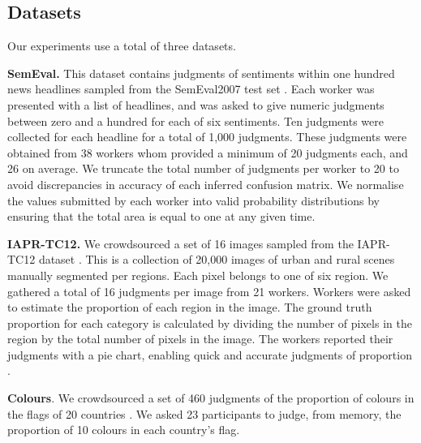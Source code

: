 \documentclass{article}
\begin{document}
\subsection{Datasets}

\label{sub:4.1-Dataset}





Our experiments use a total of three datasets. 

\textbf{SemEval.} This dataset contains judgments of sentiments
within one hundred news headlines sampled from the SemEval2007 test
set \cite{strapparava_semeval-2007_2007,snow_cheap_2008}. Each
worker was presented with a list of headlines, and was asked to give
numeric judgments between zero and a hundred for each of six sentiments.
Ten judgments were collected for each headline for a total of 1,000
judgments. These judgments were obtained from 38 workers whom provided
a minimum of 20 judgments each, and 26 on average. We truncate
the total number of judgments per worker to 20 to avoid discrepancies
in accuracy of each inferred confusion matrix. We normalise the
values submitted by each worker into valid probability distributions
by ensuring that the total area is equal to one at any given time.\textbf{} 

\textbf{IAPR-TC12.} We crowdsourced a set of 16 images sampled
from the IAPR-TC12 dataset \cite{escalante_segmented_2010,augustin_mbcc_2017}.
This is a collection of 20,000 images of urban and rural scenes
manually segmented per regions. Each pixel belongs to one of six
region. We gathered a total of 16 judgments per image from 21
workers. Workers were asked to estimate the proportion of each
region in the image. The ground truth proportion for each category
is calculated by dividing the number of pixels in the region by the
total number of pixels in the image. The workers reported their judgments
with a pie chart, enabling quick and accurate judgments of proportion
\cite{hollands_judgments_1992}. 

\textbf{Colours}. We crowdsourced a set of 460 judgments of the
proportion of colours in the flags of 20 countries \cite{augustin_mbcc_2017}.
We asked 23 participants to judge, from memory, the proportion of
10 colours in each country's flag. 
\end{document}

